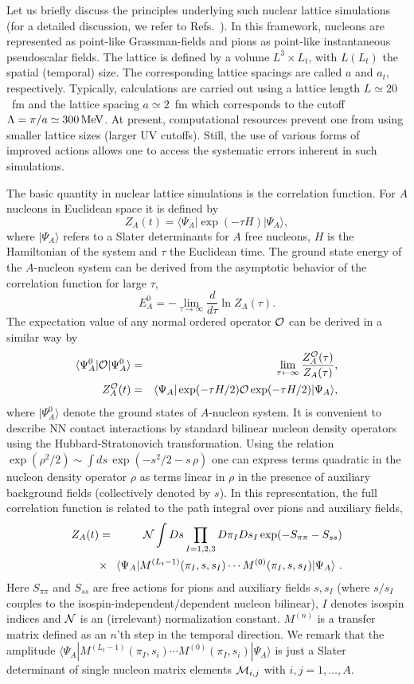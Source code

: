 \documentclass[aps,rmp,nofootinbib,twocolumn,floatfix]{revtex4}
\newcommand{\beq}{\begin{equation}}
\newcommand{\eeq}{\end{equation}}
\newcommand{\beqa}{\begin{eqnarray}}
\newcommand{\eeqa}{\end{eqnarray}}
\begin{document}
Let us briefly discuss the principles underlying such nuclear lattice
simulations (for a detailed discussion, we refer to Refs.~\cite{Lee:2004si,Borasoy:2006qn}).
In this framework, nucleons are represented 
as point-like Grassman-fields  and pions as point-like instantaneous
pseudoscalar fields. 
The lattice is defined by a volume $L^3 \times L_t$, with $L (L_t)$ the
spatial (temporal) size. The corresponding lattice spacings are called
$a$ and $a_t$, respectively. Typically, calculations are carried out using a lattice
length $L\simeq 20$~fm and the lattice spacing $a\simeq 2$~fm which corresponds
to the cutoff $\Lambda=\pi/a\simeq 300 \,{\rm MeV}$. At present, computational
resources prevent one from using smaller lattice sizes (larger UV cutoffs).
Still, the use of various forms of improved actions allows one to access the
systematic errors inherent in such simulations.

The basic quantity in nuclear lattice simulations is the correlation
function.  For $A$ nucleons in  Euclidean space it is defined by
\beq
Z_A(t)=\langle\Psi_A|\exp(-\tau H)|\Psi_A\rangle,
\eeq
where  $|\Psi_A\rangle$ refers to a Slater determinants for $A$ free 
nucleons, $H$ is the Hamiltonian of the system and $\tau$ the Euclidean time. The 
ground state energy of the $A$-nucleon system can be derived from the 
asymptotic behavior of the correlation function for large $\tau$,
\beq
E_A^0=-\lim_{\tau\rightarrow\infty}\frac{d}{d \tau}\ln Z_A(\tau).
\eeq
The expectation value of any normal ordered operator ${\cal O}$ can be derived in
a similar way by
\beqa
\langle\Psi_A^0|{\cal O}|\Psi_A^0\rangle &=&\lim_{\tau\leftarrow\infty}
\frac{Z_A^{{\cal O}}(\tau)}{Z_A(\tau)},  \\
Z_A^{{\cal O}}(t)&=&\langle\Psi_A|\exp(-\tau H/2){\cal O}\exp(-\tau H/2)|
\Psi_A\rangle,
\nonumber
\eeqa
where $|\Psi_A^0\rangle$ denote the ground states of 
$A$-nucleon system. It is convenient to describe NN contact
interactions by standard bilinear nucleon density operators using the
Hubbard-Stratonovich transformation. Using the relation
$\exp(\rho^2/2)\sim\int ds\, \exp(-s^2/2-s \,\rho)$
 one can
express terms quadratic in the nucleon density operator $\rho$ as terms 
linear in $\rho$ in the presence of auxiliary background fields (collectively
denoted by $s$). In this
representation, the full correlation function is related to the path integral
over pions and auxiliary fields,
\beqa
Z_A(t)&=& {\cal N}\int
Ds \prod_{I=1,2,3} D\pi_I Ds_I\exp(-S_{\pi\pi}-S_{ss})\nonumber\\
&\times& \!\!\! 
\langle\Psi_A|M^{(L_t-1)}(\pi_I,s,s_I)\cdots
M^{(0)}(\pi_I,s,s_I)|\Psi_A\rangle~.
\nonumber\\
\eeqa
Here $S_{\pi\pi}$ and $S_{ss}$ are free actions for pions and auxiliary fields
$s, s_I$ (where $s/s_I$ couples to the isospin-independent/dependent nucleon
bilinear), $I$ denotes isospin indices and ${\cal N}$ is an (irrelevant)
normalization constant. $M^{(n)}$ is a transfer matrix 
defined as an $n$'th step in the
temporal direction. We remark that the amplitude
$\langle\Psi_A|M^{(L_t-1)}(\pi_I,s_i)\cdots M^{(0)}(\pi_I,s_i)|\Psi_A\rangle$
is just a Slater determinant of single nucleon matrix elements 
${\cal M}_{i,j}$ with $i,j=1,\dots,A$.
\end{document}
